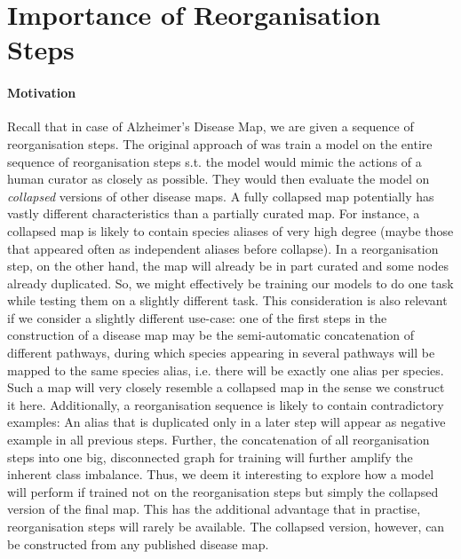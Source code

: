 \documentclass[
	fontsize=10pt, %
	twoside=false, %
	secnumdepth=1, %
  toc=indentunnumbered %
]{kaobook}
\begin{document}



\section{Importance of Reorganisation Steps}
\paragraph{Motivation} Recall that in case of Alzheimer's Disease Map, we are
given a sequence of reorganisation steps. The original approach of \nielsen was
train a model on the entire sequence of reorganisation steps s.t. the model
would mimic the actions of a human curator as closely as possible. They would
then evaluate the model on \textit{collapsed} versions of other disease maps.
%
A fully collapsed map potentially has vastly different characteristics than a
partially curated map. For instance, a collapsed map is likely to contain
species aliases of very high degree (maybe those that appeared often as
independent aliases before collapse). In a reorganisation step, on the other
hand, the map will already be in part curated and some nodes already duplicated.
%
So, we might effectively be training our models to do one task while testing
them on a slightly different task.
%
This consideration is also relevant if we consider a slightly different
use-case: one of the first steps in the construction of a disease map may be the
semi-automatic concatenation of different pathways, during which species
appearing in several pathways will be mapped to the same species alias, i.e.
there will be exactly one alias per species. Such a map will very closely
resemble a collapsed map in the sense we construct it here.
%
Additionally, a reorganisation sequence is likely to contain contradictory
examples: An alias that is duplicated only in a later step will appear as
negative example in all previous steps. Further, the concatenation of all
reorganisation steps into one big, disconnected graph for training
will further amplify the inherent class imbalance.
%
Thus, we deem it interesting to explore how a model will perform if trained not
on the reorganisation steps but simply the collapsed version of the final map.
%
This has the additional advantage that in practise, reorganisation steps will
rarely be available. The collapsed version, however, can be constructed from any
published disease map.
\end{document}
